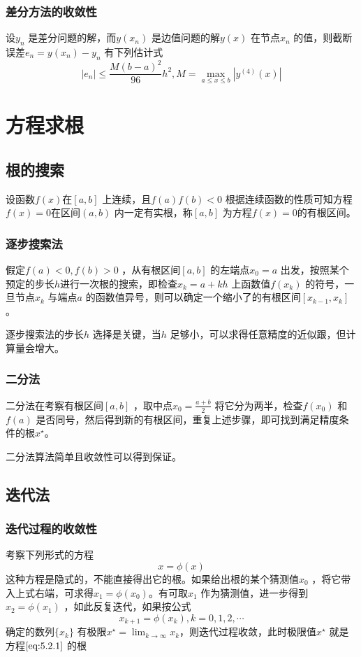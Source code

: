 \documentclass[a4paper]{article}
\begin{document}
\subsubsection{差分方法的收敛性}
\begin{theorem}
	设$y_{n}$ 是差分问题的解，而$y(x_{n})$ 是边值问题的解$y(x)$ 在节点$x_{n}$ 的值，则截断误差$e_n = y(x_{n}) - y_{n}$ 有下列估计式
	\[
		| e_n | \le \frac{M (b-a)^2}{96} h^2, M = \max_{a \le x \le b}| y^{(4)}(x) | \tag{4.7.5} \label{eq:4.7.5} 
	\] 
\end{theorem}

\section{方程求根}
\subsection{根的搜索}
设函数$f(x)$在$[a,b]$ 上连续，且$f(a)f(b) < 0$ 根据连续函数的性质可知方程$f(x) = 0$在区间$(a,b)$ 内一定有实根，称$[a,b]$ 为方程$f(x) = 0$的有根区间。
\subsubsection{逐步搜索法}
假定$f(a) < 0, f(b) > 0$ ，从有根区间$[a,b]$ 的左端点$x_0 = a$ 出发，按照某个预定的步长$h$进行一次根的搜索，即检查$x_{k} = a + kh$ 上函数值$f(x_{k})$ 的符号，一旦节点$x_{k}$ 与端点$a$ 的函数值异号，则可以确定一个缩小了的有根区间$[x_{k-1},x_{k}]$。

逐步搜索法的步长$h$ 选择是关键，当$h$ 足够小，可以求得任意精度的近似跟，但计算量会增大。

\subsubsection{二分法}
二分法在考察有根区间$[a,b]$ ，取中点$x_0 = \frac{a+b}{2}$ 将它分为两半，检查$f(x_0)$ 和$f(a)$ 是否同号，然后得到新的有根区间，重复上述步骤，即可找到满足精度条件的根$x^{\star}$。

二分法算法简单且收敛性可以得到保证。

\subsection{迭代法}
\subsubsection{迭代过程的收敛性}
考察下列形式的方程
\[
x = \phi(x) \tag{5.2.1} \label{eq:5.2.1} 
\] 
这种方程是隐式的，不能直接得出它的根。如果给出根的某个猜测值$x_0$ ，将它带入上式右端，可求得$x_1 = \phi(x_0)$。有可取$x_1$ 作为猜测值，进一步得到$x_2 = \phi(x_1)$ ，如此反复迭代，如果按公式
\[
x_{k+1} = \phi(x_{k}), k = 0,1,2,\cdots \tag{5.2.2} \label{eq:5.2.2} 
\] 
确定的数列$\{x_{k}\} $ 有极限$x^{\star} = \lim_{k \to \infty} x_{k}$，则迭代过程收敛，此时极限值$x^{\star}$ 就是方程$\ref{eq:5.2.1}$ 的根
\end{document}
